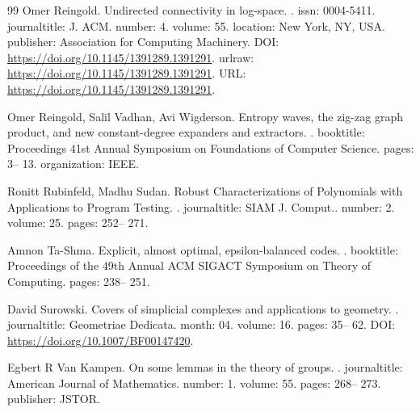 \begin{thebibliography}{99}
Omer Reingold.
\newblock Undirected connectivity in log-space.
.
\newblock issn: 0004-5411.
\newblock journaltitle: J. ACM.
\newblock number: 4.
\newblock volume: 55.
\newblock location: New York, NY, USA.
\newblock publisher: Association for Computing Machinery.
\newblock DOI: \url{https://doi.org/10.1145/1391289.1391291}.
\newblock urlraw: \url{https://doi.org/10.1145/1391289.1391291}.
\newblock URL: \url{https://doi.org/10.1145/1391289.1391291}.

Omer Reingold, Salil Vadhan, Avi Wigderson.
\newblock Entropy waves, the zig-zag graph product, and new constant-degree expanders and extractors.
.
\newblock booktitle: Proceedings 41st Annual Symposium on Foundations of Computer Science.
\newblock pages: 3-- 13.
\newblock organization: IEEE.

Ronitt Rubinfeld, Madhu Sudan.
\newblock Robust Characterizations of Polynomials with Applications to Program Testing.
.
\newblock journaltitle: {SIAM} J. Comput..
\newblock number: 2.
\newblock volume: 25.
\newblock pages: 252-- 271.

Amnon Ta-Shma.
\newblock Explicit, almost optimal, epsilon-balanced codes.
.
\newblock booktitle: Proceedings of the 49th Annual ACM SIGACT Symposium on Theory of Computing.
\newblock pages: 238-- 251.

David Surowski.
\newblock Covers of simplicial complexes and applications to geometry.
.
\newblock journaltitle: Geometriae Dedicata.
\newblock month: 04.
\newblock volume: 16.
\newblock pages: 35-- 62.
\newblock DOI: \url{https://doi.org/10.1007/BF00147420}.

Egbert R Van Kampen.
\newblock On some lemmas in the theory of groups.
.
\newblock journaltitle: American Journal of Mathematics.
\newblock number: 1.
\newblock volume: 55.
\newblock pages: 268-- 273.
\newblock publisher: JSTOR.

\end{thebibliography}
